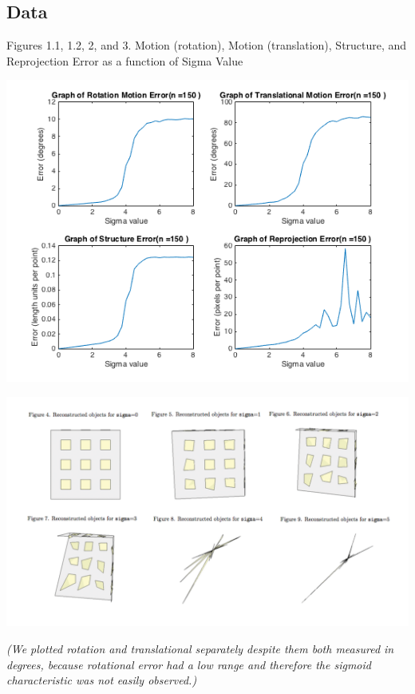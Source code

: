 \documentclass{article}
\begin{document}
\subsection{Data}
\begin{center}
	\begin{center}Figures 1.1, 1.2, 2, and 3. Motion (rotation), Motion (translation), Structure, and Reprojection Error as a function of Sigma Value\end{center}
	\includegraphics[width=.7\textwidth,keepaspectratio]{experiment_1_error_plots.png}

	\includegraphics[width=\textwidth,keepaspectratio]{reconstructed_objects.png}
\end{center}

\textit{(We plotted rotation and translational separately despite them both measured in degrees, because rotational error had a low range and therefore the sigmoid characteristic was not easily observed.)}

\end{document}

